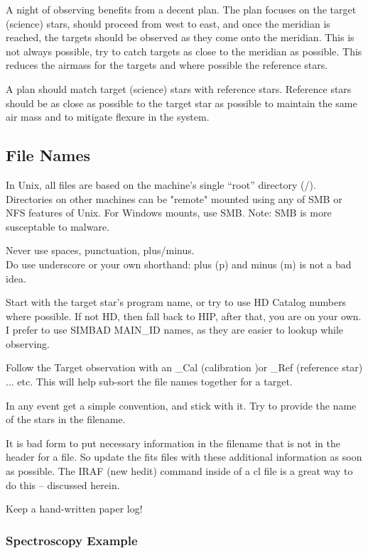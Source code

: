A night of observing benefits from a decent plan. The plan focuses on the target
(science) stars, should proceed from west to east, and once the meridian is reached,
the targets should be observed as they come onto the meridian. This is not always
possible, try to catch targets as close to the meridian as possible. This reduces
the airmass for the targets and where possible the reference stars.

A plan should match target (science) stars with reference stars. Reference stars should be
as close as possible to the target star as possible to maintain the same air mass
and to mitigate flexure in the system. 

\subsection{File Names}

In Unix, all files are based on the machine's single ``root''
directory (/). Directories on other machines can be "remote" mounted
using any of SMB or NFS features of Unix. For Windows mounts, use
SMB. Note: SMB is more susceptable to malware.

Never use spaces, punctuation, plus/minus. \\
Do use underscore or your own shorthand: plus (p) and minus (m) is not a bad idea.

Start with the target star's program name, or try to use HD Catalog
numbers where possible.  If not HD, then fall back to HIP, after that,
you are on your own. I prefer to use SIMBAD MAIN\_ID names, as they
are easier to lookup while observing.

Follow the Target observation with an \_Cal (calibration )or \_Ref
(reference star) ... etc. This will help sub-sort the file names together
for a target.

In any event get a simple convention, and stick with it. Try to provide
the name of the stars in the filename.

It is bad form to put necessary information in the filename that is
not in the header for a file. So update the fits files with these
additional information as soon as possible. The IRAF  (new
hedit) command inside of a cl file is a great way to do this --
discussed herein.

Keep a hand-written paper log!

\subsubsection{Spectroscopy Example}


